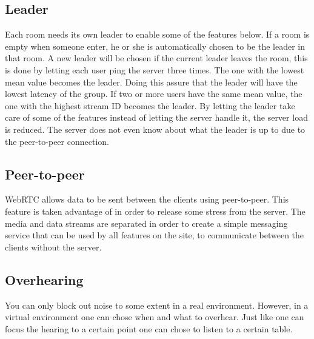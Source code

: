 \documentclass[12pt, titlepage]{article}
\begin{document}
\subsection{Leader}
Each room needs its own leader to enable some of the features below. If a room is empty when someone enter, he or she is automatically chosen to be the leader in that room. A new leader will be chosen if the current leader leaves the room, this is done by letting each user ping the server three times. The one with the lowest mean value becomes the leader. Doing this assure that the leader will have the lowest latency of the group. If two or more users have the same mean value, the one with the highest stream ID becomes the leader. By letting the leader take care of some of the features instead of letting the server handle it, the server load is reduced. The server does not even know about what the leader is up to due to the peer-to-peer connection.
\subsection{Peer-to-peer}
WebRTC allows data to be sent between the clients using peer-to-peer. This feature is taken advantage of in order to release some stress from the server. The media and data streams are separated in order to create a simple messaging service that can be used by all features on the site, to communicate between the clients without the server.
\subsection{Overhearing}
You can only block out noise to some extent in a real environment. However, in a virtual environment one can chose when and what to overhear. Just like one can focus the hearing to a certain point one can chose to listen to a certain table.
\end{document}

